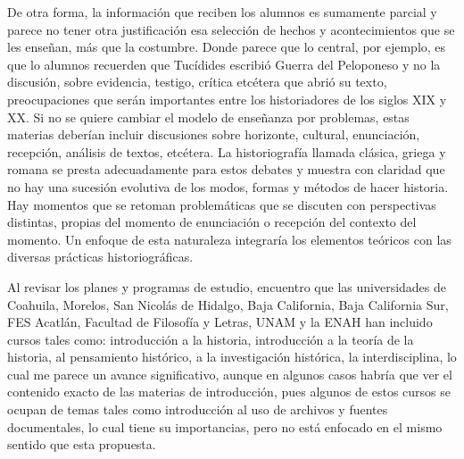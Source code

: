 De otra forma, la información que reciben los alumnos es sumamente 
parcial y parece no tener otra justificación esa selección de hechos y 
acontecimientos que se les enseñan, más que la costumbre. Donde parece 
que lo central, por ejemplo, es que lo alumnos recuerden que Tucídides 
escribió Guerra del Peloponeso y no la discusión, sobre evidencia, 
testigo, crítica etcétera que abrió su texto, preocupaciones que serán 
importantes entre los historiadores de los siglos XIX y XX. Si no se 
quiere cambiar el modelo de enseñanza por problemas, estas materias 
deberían incluir discusiones sobre horizonte, cultural, enunciación, 
recepción, análisis de textos, etcétera. La historiografía llamada 
clásica, griega y romana se presta adecuadamente para estos debates y 
muestra con claridad que no hay una sucesión evolutiva de los modos, 
formas y métodos de hacer historia. Hay momentos que se retoman 
problemáticas que se discuten con perspectivas distintas, propias del 
momento de enunciación o recepción del contexto del momento. Un enfoque 
de esta naturaleza integraría los elementos teóricos con las diversas 
prácticas historiográficas. 

Al revisar los planes y programas de estudio, encuentro que las uni\-ver\-si\-da\-des
de Coahuila, Morelos, San Nicolás de Hidalgo, Baja
California, Baja California Sur, FES Acatlán, Facultad de Filosofía y
Letras, UNAM y la ENAH han incluido cursos tales como: introducción a la
historia, introducción a la teoría de la historia, al pensamiento
histórico, a la investigación histórica, la interdisciplina, lo cual me
parece un avance significativo, aunque en algunos casos habría que ver el
contenido exacto de las materias de introducción, pues algunos de estos
cursos se ocupan de temas tales como introducción al uso de archivos y
fuentes documentales, lo cual tiene su importancias, pero no está enfocado
en el mismo sentido que esta propuesta. 

